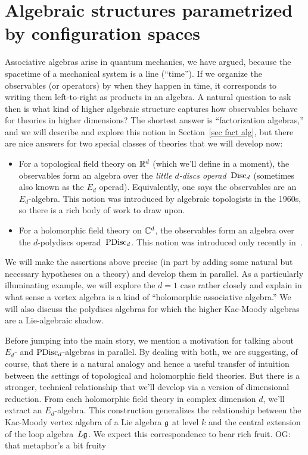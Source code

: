 \documentclass[11pt]{amsart}
\def\owen#1{{\textcolor{violet!65!black}{OG: {#1}}}}
\begin{document}
\section{Algebraic structures parametrized by configuration spaces}

Associative algebras arise in quantum mechanics, we have argued, because the spacetime of a mechanical system is a line (``time'').
If we organize the observables (or operators) by when they happen in time,
it corresponds to writing them left-to-right as products in an algebra.
A natural question to ask then is what kind of higher algebraic structure captures how observables behave for theories in higher dimensions?
The shortest answer is ``factorization algebras,'' and we will describe and explore this notion in Section~\ref{sec fact alg},
but there are nice answers for two special classes of theories that we will develop now:
\begin{itemize}
\item For a topological field theory on $\mathbb R^d$ (which we'll define in a moment),
the observables form an algebra over the {\em little $d$-discs operad}~${\rm Disc}_d$ (sometimes also known as the $E_d$ operad). 
Equivalently, one says the observables are an $E_d$-algebra. 
This notion was introduced by algebraic topologists in the 1960s, 
so there is a rich body of work to draw upon.
\item For a holomorphic field theory on $\mathbb C^d$,
the observables form an algebra over the $d$-polydiscs operad~${\rm PDisc}_d$.
This notion was introduced only recently in~\cite{CG1}.
\end{itemize}
We will make the assertions above precise (in part by adding some natural but necessary hypotheses on a theory)
and develop them in parallel.
As a particularly illuminating example, we will explore the $d=1$ case rather closely and explain in what sense a vertex algebra is a kind of ``holomorphic associative algebra.''
We will also discuss the polydiscs algebras for which the higher Kac-Moody algebras are a Lie-algebraic shadow.

Before jumping into the main story, we mention a motivation for talking about $E_d$- and ${\rm PDisc}_d$-algebras in parallel.
By dealing with both, we are suggesting, of course, that there is a natural analogy and hence a useful transfer of intuition between the settings of topological and holomorphic field theories.
But there is a stronger, technical relationship that we'll develop via a version of dimensional reduction.
From each holomorphic field theory in complex dimension $d$, 
we'll extract an $E_d$-algebra.
This construction generalizes the relationship between the Kac-Moody vertex algebra of a Lie algebra $\mathfrak g$ at level $k$ and the central extension of the loop algebra~$L\mathfrak g$.
We expect this correspondence to bear rich fruit.
\owen{that metaphor's a bit fruity}
\end{document}
